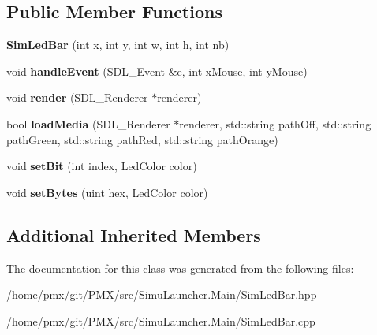 \subsection*{Public Member Functions}
\begin{DoxyCompactItemize}
\item 
\mbox{\label{classSimLedBar_a1c25f2c7fca19536f38b22121a3c3bda}} 
{\bfseries Sim\+Led\+Bar} (int x, int y, int w, int h, int nb)
\item 
\mbox{\label{classSimLedBar_a6ed1224d52efb3ac88bb58533740eb97}} 
void {\bfseries handle\+Event} (S\+D\+L\+\_\+\+Event \&e, int x\+Mouse, int y\+Mouse)
\item 
\mbox{\label{classSimLedBar_a2661eb5f58a942419aefdea869b823f0}} 
void {\bfseries render} (S\+D\+L\+\_\+\+Renderer $\ast$renderer)
\item 
\mbox{\label{classSimLedBar_a48c8f7de3dffefebe1bc024bbab4fdfa}} 
bool {\bfseries load\+Media} (S\+D\+L\+\_\+\+Renderer $\ast$renderer, std\+::string path\+Off, std\+::string path\+Green, std\+::string path\+Red, std\+::string path\+Orange)
\item 
\mbox{\label{classSimLedBar_a3110bb92ad1531a68e3c846071569786}} 
void {\bfseries set\+Bit} (int index, Led\+Color color)
\item 
\mbox{\label{classSimLedBar_a23909eb1de40ebfa2546ff459872f57f}} 
void {\bfseries set\+Bytes} (uint hex, Led\+Color color)
\end{DoxyCompactItemize}
\subsection*{Additional Inherited Members}


The documentation for this class was generated from the following files\+:\begin{DoxyCompactItemize}
\item 
/home/pmx/git/\+P\+M\+X/src/\+Simu\+Launcher.\+Main/Sim\+Led\+Bar.\+hpp\item 
/home/pmx/git/\+P\+M\+X/src/\+Simu\+Launcher.\+Main/Sim\+Led\+Bar.\+cpp\end{DoxyCompactItemize}
